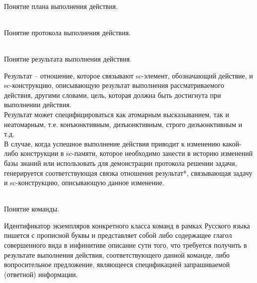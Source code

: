 \begin{frame}{\\Понятие плана выполнения действия.}
	\topline
	\justifying
\end{frame}

\begin{frame}{\\Понятие протокола выполнения действия.}
	\topline
	\justifying
 
\end{frame}

\begin{frame}{\\Понятие результата выполнения действия.}
	\topline
	\justifying
 
    Результат -- отношение, которое  связывают sc-элемент, обозначающий действие, и sc-конструкцию, описывающую результат выполнения рассматриваемого действия, другими словами, цель, которая должна быть достигнута при выполнении действия.\\
    Результат может специфицироваться как атомарным высказыванием, так и неатомарным, т.е. конъюнктивным, дизъюнктивным, строго дизъюнктивным и т.д.\\
    В случае, когда успешное выполнение действия приводит к изменению какой-либо конструкции в sc-памяти,  которое необходимо занести в историю изменений базы знаний или использовать для демонстрации протокола решении задачи, генерируется соответствующая связка отношения результат*, связывающая  задачу и sc-конструкцию, описывающую данное изменение. 
\end{frame}


\begin{frame}{\\Понятие команды.}
	\topline
	\justifying

    
   Идентификатор экземпляров конкретного класса команд в рамках Русского языка пишется с прописной буквы и представляет собой либо содержащее глагол совершенного вида в инфинитиве описание сути того, что требуется получить в результате выполнения действия, соответствующего данной команде, либо вопросительное предложение, являющееся спецификацией запрашиваемой (ответной) информации.
\end{frame}

